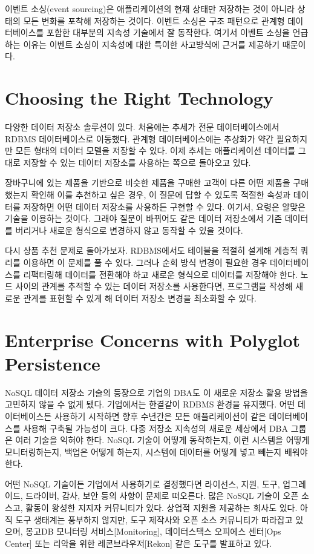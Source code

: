 \documentclass[twocolumn]{article}
\begin{document}
이벤트 소싱(event sourcing)은 애플리케이션의 현재 상태만 저장하는 것이 아니라 상태의 모든 변화를 포착해 저장하는 것이다. 이벤트 소싱은 구조 패턴으로 관계형 데이터베이스를 포함한 대부분의 지속성 기술에서 잘 동작한다. 여기서 이벤트 소싱을 언급하는 이유는 이벤트 소싱이 지속성에 대한 특이한 사고방식에 근거를 제공하기 때문이다.


\section{Choosing the Right Technology}
다양한 데이터 저장소 솔루션이 있다. 처음에는 추세가 전문 데이터베이스에서 RDBMS 데이터베이스로 이동했다. 관계형 데이터베이스에는 추상화가 약간 필요하지만 모든 형태의 데이터 모델을 저장할 수 있다. 이제 추세는 애플리케이션 데이터를 그대로 저장할 수 있는 데이터 저장소를 사용하는 쪽으로 돌아오고 있다.

장바구니에 있는 제품을 기반으로 비슷한 제품을 구매한 고객이 다른 어떤 제품을 구매했는지 확인해 이를 추천하고 싶은 경우, 이 질문에 답할 수 있도록 적절한 속성과 데이터를 저장하면 어떤 데이터 저장소를 사용하든 구현할 수 있다. 여기서, 요령은 알맞은 기술을 이용하는 것이다. 그래야 질문이 바뀌어도 같은 데이터 저장소에서 기존 데이터를 버리거나 새로운 형식으로 변경하지 않고 동작할 수 있을 것이다.

다시 상품 추천 문제로 돌아가보자. RDBMS에서도 테이블을 적절히 설계해 계층적 쿼리를 이용하면 이 문제를 풀 수 있다. 그러나 순회 방식 변경이 필요한 경우 데이터베이스를 리팩터링해 데이터를 전환해야 하고 새로운 형식으로 데이터를 저장해야 한다. 노드 사이의 관계를 추적할 수 있는 데이터 저장소를 사용한다면, 프로그램을 작성해 새로운 관계를 표현할 수 있게 해 데이터 저장소 변경을 최소화할 수 있다.

\section{Enterprise Concerns with Polyglot Persistence}
NoSQL 데이터 저장소 기술의 등장으로 기업의 DBA도 이 새로운 저장소 활용 방법을 고민하지 않을 수 없게 됐다. 기업에서는 한결같이 RDBMS 환경을 유지했다. 어떤 데이터베이스든 사용하기 시작하면 향후 수년간은 모든 애플리케이션이 같은 데이터베이스를 사용해 구축될 가능성이 크다. 다중 저장소 지속성의 새로운 세상에서 DBA 그룹은 여러 기술을 익혀야 한다. NoSQL 기술이 어떻게 동작하는지, 이런 시스템을 어떻게 모니터링하는지, 백업은 어떻게 하는지, 시스템에 데이터를 어떻게 넣고 빼는지 배워야 한다.

어떤 NoSQL 기술이든 기업에서 사용하기로 결정했다면 라이선스, 지원, 도구, 업그레이드, 드라이버, 감사, 보안 등의 사항이 문제로 떠오른다. 많은 NoSQL 기술이 오픈 소스고, 활동이 왕성한 지지자 커뮤니티가 있다. 상업적 지원을 제공하는 회사도 있다. 아직 도구 생태계는 풍부하지 않지만, 도구 제작사와 오픈 소스 커뮤니티가 따라잡고 있으며, 몽고DB 모니터링 서비스[Monitoring], 데이터스택스 오피에스 센터[Ops Center] 또는 리악을 위한 레콘브라우저[Rekon] 같은 도구를 발표하고 있다.
\end{document}
